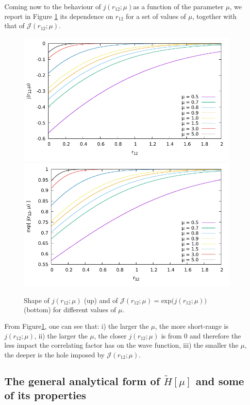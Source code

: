 \documentclass[aip,jcp,reprint,noshowkeys,superscriptaddress]{revtex4-1}
\begin{document}
Coming now to the behaviour of $j(r_{12};\mu)$as a function of the parameter $\mu$, we report in Figure \ref{fig_j_mu} its dependence on $r_{12}$ for a set of values of $\mu$, together with that of $\mathcal{J}(r_{12};\mu)$. 
\begin{figure}
 \label{fig_j_mu}
        \includegraphics[width=0.45\linewidth]{small_mu_j.pdf}
        \includegraphics[width=0.45\linewidth]{small_mu_exp_j.pdf}\\
        \caption{Shape of $j(r_{12};\mu)$ (up) and of $\mathcal{J}(r_{12};\mu) = \text{exp}\bigg(j(r_{12};\mu) \bigg) $ (bottom) for different values of $\mu$.}
\end{figure}
From Figure\ref{fig_j_mu}, one can see that: i) the larger the $\mu$, the more short-range is $j(r_{12};\mu)$, ii) the larger the $\mu$, the closer $j(r_{12};\mu)$ is from 0 and therefore the less impact the correlating factor has on the wave function, iii) the smaller the $\mu$, the deeper is the hole imposed by $\mathcal{J}(r_{12};\mu)$. 


\subsection{The general analytical form of  $\tilde{H}[\mu]$ and some of its properties}
\end{document}
